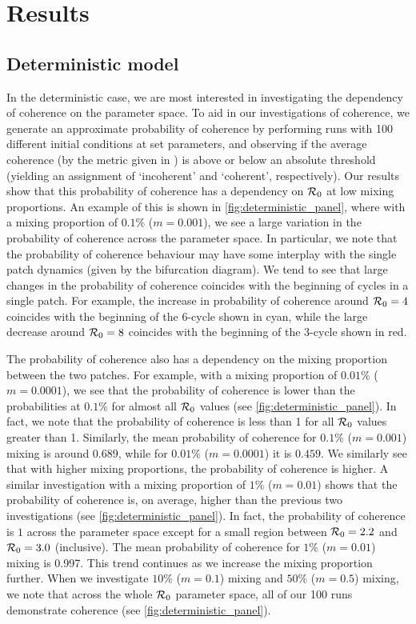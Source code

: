 \documentclass[12pt]{article}
\newcommand{\R}{{\cal R}}
\begin{document}
\section{Results} \label{sec:numerical}
\subsection{Deterministic model} \label{ss:deterministic}
In the deterministic case, we are most interested in investigating the dependency of coherence on the parameter space. To aid in our investigations of coherence, we generate an approximate probability of coherence by performing runs with 100 different initial conditions at set parameters, and observing if the average coherence (by the metric given in ) is above or below an absolute threshold (yielding an assignment of `incoherent’ and `coherent’, respectively). Our results show that this probability of coherence has a dependency on $\R_0$ at low mixing proportions. An example of this is shown in \autoref{fig:deterministic_panel}, where with a mixing proportion of $0.1\%$ ($m = 0.001$), we see a large variation in the probability of coherence across the parameter space. In particular, we note that the probability of coherence behaviour may have some interplay with the single patch dynamics (given by the bifurcation diagram). We tend to see that large changes in the probability of coherence coincides with the beginning of cycles in a single patch. For example, the increase in probability of coherence around $\R_0=4$ coincides with the beginning of the 6-cycle shown in cyan, while the large decrease around $\R_0=8$ coincides with the beginning of the 3-cycle shown in red. 

The probability of coherence also has a dependency on the mixing proportion between the two patches. For example, with a mixing proportion of $0.01\%$ ($m = 0.0001$), we see that the probability of coherence is lower than the probabilities at $0.1\%$ for almost all $\R_0$ values (see \autoref{fig:deterministic_panel}). In fact, we note that the probability of coherence is less than 1 for all $\R_0$ values greater than 1. Similarly, the mean probability of coherence for $0.1\%$ ($m=0.001$) mixing is around $0.689$, while for $0.01\%$ ($m=0.0001$) it is $0.459$. We similarly see that with higher mixing proportions, the probability of coherence is higher. A similar investigation with a mixing proportion of $1\%$ ($m=0.01$) shows that the probability of coherence is, on average, higher than the previous two investigations (see \autoref{fig:deterministic_panel}). In fact, the probability of coherence is $1$ across the parameter space except for a small region between $\R_0=2.2$ and $\R_0=3.0$ (inclusive). The mean probability of coherence for $1\%$ ($m=0.01$) mixing is 0.997. This trend continues as we increase the mixing proportion further. When we investigate $10\%$ ($m=0.1$) mixing and $50\%$ ($m=0.5$) mixing, we note that across the whole $\R_0$ parameter space, all of our 100 runs demonstrate coherence (see \autoref{fig:deterministic_panel}).
\end{document}

